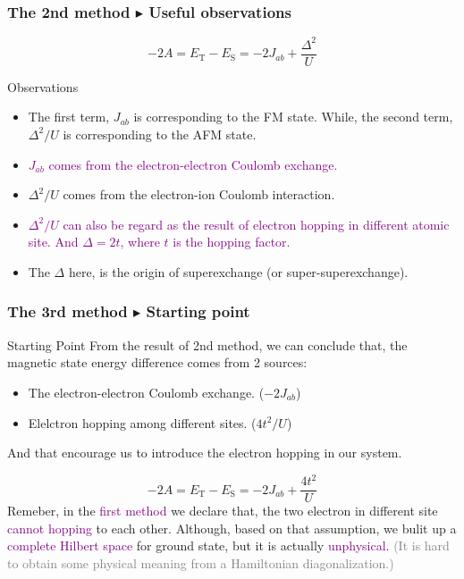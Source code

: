 \documentclass{beamer}
\begin{document}
  \begin{frame}
    \frametitle{The 2nd method \(\blacktriangleright\) Useful observations}
    \begin{equation*}
      -2A = E_\text{T} - E_\text{S} = -2J_{ab} + \dfrac{\Delta^2}{U}
    \end{equation*}
    \begin{block}{Observations}
      \begin{itemize}
        \item The first term, \(J_{ab}\) is corresponding to the FM state. While, the second term, \(\Delta^2/U\) is corresponding to the AFM state.
        \item \textcolor{purple}{\(J_{ab}\) comes from the electron-electron Coulomb exchange.}
        \item \(\Delta^2/U\) comes from the electron-ion Coulomb interaction.
        \item \textcolor{purple}{\(\Delta^2/U\) can also be regard as the result of electron hopping in different atomic site. And \(\Delta = 2t\), where \(t\) is the hopping factor.}
        \item The \(\Delta\) here, is the origin of superexchange (or super-superexchange).
      \end{itemize}
    \end{block}
  \end{frame}

  \begin{frame}
    \frametitle{The 3rd method \(\blacktriangleright\) Starting point}
    \begin{block}{Starting Point}
      From the result of 2nd method, we can conclude that, the magnetic state energy difference comes from 2 sources: 
      \begin{itemize}
        \item The electron-electron Coulomb exchange. (\(-2J_{ab}\)) 
        \item Elelctron hopping among different sites. (\(4t^2/U\))
      \end{itemize} 
      And that encourage us to introduce the electron hopping in our system.
    \end{block}
    \begin{equation*}
      -2A = E_\text{T} - E_\text{S} = -2J_{ab} + \dfrac{4t^2}{U}
    \end{equation*}
    Remeber, in the \textcolor{purple}{first method} we declare that, the two electron in different site \textcolor{purple}{cannot hopping} to each other. Although, based on that assumption, we bulit up a \textcolor{purple}{complete Hilbert space} for ground state, but it is actually \textcolor{purple}{unphysical}. \textcolor{gray}{(It is hard to obtain some physical meaning from a Hamiltonian diagonalization.)}
  \end{frame}
\end{document}
